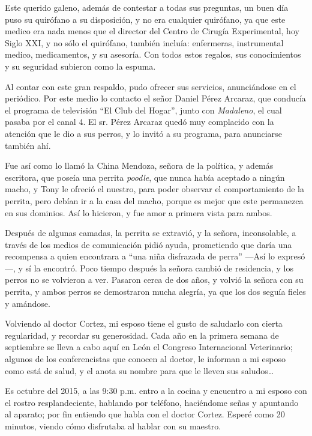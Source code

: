 \documentclass[letterpaper, 12pt]{book}
\begin{document}
Este querido galeno, además de contestar a todas sus preguntas, un buen día puso su quirófano a su disposición, y no era cualquier quirófano, ya que este medico era nada menos que el director del Centro de Cirugía Experimental, hoy Siglo XXI, y no sólo el quirófano, también incluía: enfermeras, instrumental medico, medicamentos, y su asesoría. Con todos estos regalos, sus conocimientos y su seguridad subieron como la espuma.

Al contar con este gran respaldo, pudo ofrecer sus servicios, anunciándose en el periódico. Por este medio lo contacto el señor Daniel Pérez Arcaraz, que conducía el programa de televisión ``El Club del Hogar'', junto con {\it Madaleno}, el cual pasaba por el canal 4. El sr. Pérez Arcaraz quedó muy complacido con la atención que le dio a sus perros, y lo invitó a su programa, para anunciarse también ahí. 

Fue así como lo llamó la China Mendoza, señora de la política, y además escritora, que poseía una perrita {\it poodle}, que nunca había aceptado a ningún macho, y Tony le ofreció el nuestro, para poder observar el comportamiento de la perrita, pero debían ir a la casa del macho, porque es mejor que este permanezca en sus dominios. Así lo hicieron, y fue amor a primera vista para ambos.

Después de algunas camadas, la perrita se extravió, y la señora, inconsolable, a través de los medios de comunicación pidió ayuda, prometiendo que daría una recompensa a quien encontrara a ``una niña disfrazada de perra'' ---Así lo expresó---, y sí la encontró. Poco tiempo después la señora cambió de residencia, y los perros no se volvieron a ver. Pasaron cerca de dos años, y volvió la señora con su perrita, y ambos perros se demostraron mucha alegría, ya que los dos seguía fieles y amándose.

Volviendo al doctor Cortez, mi esposo tiene el gusto de saludarlo con cierta regularidad, y recordar su generosidad. Cada año en la primera semana de septiembre se lleva a cabo aquí en León el Congreso Internacional Veterinario; algunos de los conferencistas que conocen al doctor, le informan a mi esposo como está de salud, y el anota su nombre para que le lleven sus saludos\ldots

Es octubre del 2015, a las 9:30 p.m. entro a la cocina y encuentro a mi esposo con el rostro resplandeciente, hablando por teléfono, haciéndome señas y apuntando al aparato; por fin entiendo que habla con el doctor Cortez. Esperé como 20 minutos, viendo cómo disfrutaba al hablar con su maestro.
\end{document}
